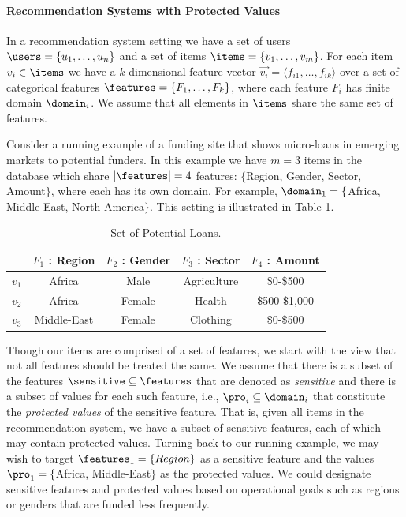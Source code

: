 \noindent \paragraph{Recommendation Systems with Protected Values} \newline
\indent In a recommendation system setting we have a set of users $\users = \{u_1, \ldots, u_n\}$ and a set of items $\items = \{v_1, \ldots, v_m\}$. For each item $v_i \in \items$ we have a $k$-dimensional feature vector $\vec{v_i} = \langle f_{i1}, \ldots, f_{ik} \rangle$ over a set of categorical features $\features = \{F_1, \ldots, F_k\}$, where each feature $F_i$ has finite domain $\domain_i$. We assume that all elements in $\items$ share the same set of features. 

Consider a running example of a funding site that shows micro-loans in emerging markets to potential funders. In this example we have $m=3$ items in the database which share $|\features|=4$ features: $\{$Region, Gender, Sector, Amount$\}$, where each has its own domain.  For example, $\domain_1 = \{$Africa, Middle-East, North America$\}$.  This setting is illustrated in Table \ref{table:user_profile}.
    
\begin{table}
    \centering
    \begin{tabular}{|c|c|c|c|c|}
    \hline
            & $F_{1}$ : Region & $F_{2}$ : Gender & $F_{3}$ : Sector & $F_{4}$ : Amount \\
    \hline
        $v_1$ & Africa & Male & Agriculture & \$0-\$500\\
    \hline
        $v_2$ & Africa & Female & Health & \$500-\$1,000\\
    \hline
        $v_3$ & Middle-East & Female & Clothing & \$0-\$500 \\
    \hline
    \end{tabular}
    \caption{Set of Potential Loans.}
    \label{table:user_profile}
\end{table}

Though our items are comprised of a set of features, we start with the view that not all features should be treated the same. We assume that there is a subset of the features $\sensitive \subseteq \features$ that are denoted as \textit{sensitive} and there is a subset of values for each such feature, i.e., $\pro_i \subseteq \domain_i$ that constitute the \emph{protected values} of the sensitive feature. That is, given all items in the recommendation system, we have a subset of sensitive features, each of which may contain protected values. Turning back to our running example, we may wish to target $\features_1=\{Region\}$ as a sensitive feature and the values $\pro_1=\{$Africa, Middle-East$\}$ as the protected values. We could designate sensitive features and protected values based on operational goals such as regions or genders that are funded less frequently.

